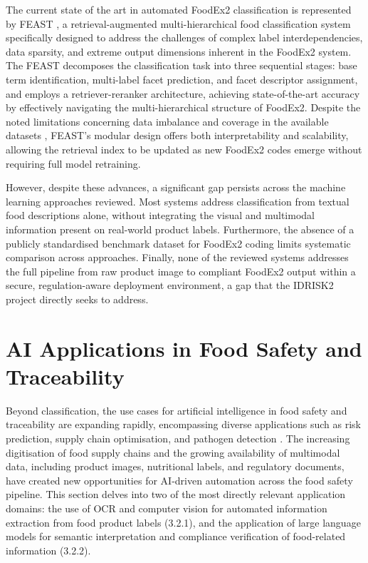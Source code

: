 The current state of the art in automated FoodEx2 classification is represented by FEAST \parencite{lorenzo_molfetta_47d7c4cd}, a retrieval-augmented multi-hierarchical food classification system specifically designed to address the challenges of complex label interdependencies, data sparsity, and extreme output dimensions inherent in the FoodEx2 system. The FEAST decomposes the classification task into three sequential stages: base term identification, multi-label facet prediction, and facet descriptor assignment, and employs a retriever-reranker architecture, achieving state-of-the-art accuracy by effectively navigating the multi-hierarchical structure of FoodEx2. Despite the noted limitations concerning data imbalance and coverage in the available datasets \parencite{lorenzo_molfetta_47d7c4cd}, FEAST's modular design offers both interpretability and scalability, allowing the retrieval index to be updated as new FoodEx2 codes emerge without requiring full model retraining.

However, despite these advances, a significant gap persists across the machine learning approaches reviewed. Most systems address classification from textual food descriptions alone, without integrating the visual and multimodal information present on real-world product labels. Furthermore, the absence of a publicly standardised benchmark dataset for FoodEx2 coding limits systematic comparison across approaches. Finally, none of the reviewed systems addresses the full pipeline from raw product image to compliant FoodEx2 output within a secure, regulation-aware deployment environment, a gap that the IDRISK2 project directly seeks to address.

\hypertarget{ai-applications-in-food-safety-and-traceability}{%
\section{AI Applications in Food Safety and Traceability}\label{ai-applications-in-food-safety-and-traceability}}

Beyond classification, the use cases for artificial intelligence in food safety and traceability are expanding rapidly, encompassing diverse applications such as risk prediction, supply chain optimisation, and pathogen detection \parencite{chenhao_qian_8525e6ba}. The increasing digitisation of food supply chains and the growing availability of multimodal data, including product images, nutritional labels, and regulatory documents, have created new opportunities for AI-driven automation across the food safety pipeline. This section delves into two of the most directly relevant application domains: the use of OCR and computer vision for automated information extraction from food product labels (3.2.1), and the application of large language models for semantic interpretation and compliance verification of food-related information (3.2.2).


